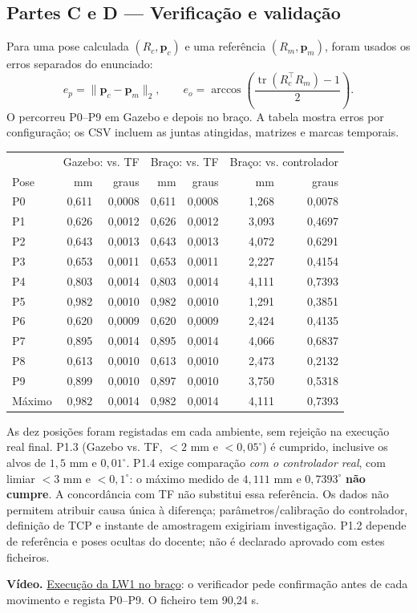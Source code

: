 \subsection{Partes C e D — Verificação e validação}
Para uma pose calculada $(R_c,\mathbf p_c)$ e uma referência $(R_m,\mathbf p_m)$, foram usados os erros separados do enunciado:
\begin{equation}
e_p=\|\mathbf p_c-\mathbf p_m\|_2,\qquad
e_o=\arccos\!\left(\frac{\operatorname{tr}(R_c^\top R_m)-1}{2}\right).
\end{equation}
O  percorreu P0--P9 em Gazebo e depois no braço. A tabela mostra erros por configuração; os CSV incluem as juntas atingidas, matrizes e marcas temporais.
\begin{center}\scriptsize
\begin{tabular}{@{}lrrrrrr@{}}\toprule
& \multicolumn{2}{c}{Gazebo: vs. TF} & \multicolumn{2}{c}{Braço: vs. TF} & \multicolumn{2}{c}{Braço: vs. controlador}\\
Pose & mm & graus & mm & graus & mm & graus\\\midrule
P0 & 0,611 & 0,0008 & 0,611 & 0,0008 & 1,268 & 0,0078\\
P1 & 0,626 & 0,0012 & 0,626 & 0,0012 & 3,093 & 0,4697\\
P2 & 0,643 & 0,0013 & 0,643 & 0,0013 & 4,072 & 0,6291\\
P3 & 0,653 & 0,0011 & 0,653 & 0,0011 & 2,227 & 0,4154\\
P4 & 0,803 & 0,0014 & 0,803 & 0,0014 & 4,111 & 0,7393\\
P5 & 0,982 & 0,0010 & 0,982 & 0,0010 & 1,291 & 0,3851\\
P6 & 0,620 & 0,0009 & 0,620 & 0,0009 & 2,424 & 0,4135\\
P7 & 0,895 & 0,0014 & 0,895 & 0,0014 & 4,066 & 0,6837\\
P8 & 0,613 & 0,0010 & 0,613 & 0,0010 & 2,473 & 0,2132\\
P9 & 0,899 & 0,0010 & 0,897 & 0,0010 & 3,750 & 0,5318\\\midrule
Máximo & 0,982 & 0,0014 & 0,982 & 0,0014 & 4,111 & 0,7393\\\bottomrule
\end{tabular}
\end{center}
As dez posições foram registadas em cada ambiente, sem rejeição na execução real final. P1.3 (Gazebo vs. TF, $<2$ mm e $<0{,}05^\circ$) é cumprido, inclusive os alvos de $1{,}5$ mm e $0{,}01^\circ$. P1.4 exige comparação \emph{com o controlador real}, com limiar $<3$ mm e $<0{,}1^\circ$: o máximo medido de $4{,}111$ mm e $0{,}7393^\circ$ \textbf{não cumpre}. A concordância com TF não substitui essa referência. Os dados não permitem atribuir causa única à diferença; parâmetros/calibração do controlador, definição de TCP e instante de amostragem exigiriam investigação. P1.2 depende de referência e poses ocultas do docente; não é declarado aprovado com estes ficheiros.

\textbf{Vídeo.} \href{\repo/lw1/lw1_fk_real.mp4}{Execução da LW1 no braço}: o verificador pede confirmação antes de cada movimento e regista P0--P9. O ficheiro tem 90,24 s.
